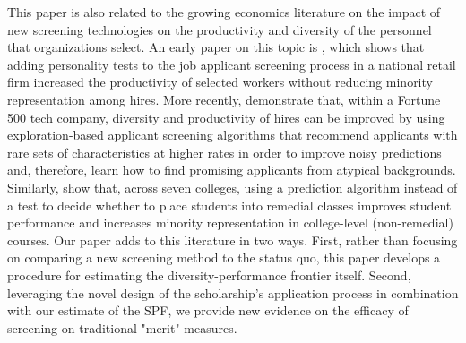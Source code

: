 This paper is also related to the growing economics literature on the impact of new screening technologies on the productivity and diversity of the personnel that organizations select. An early paper on this topic is , which shows that adding personality tests to the job applicant screening process in a national retail firm increased the productivity of selected workers without reducing minority representation among hires. More recently,  demonstrate that, within a Fortune 500 tech company, diversity and productivity of hires can be improved by using exploration-based applicant screening algorithms that recommend applicants with rare sets of characteristics at higher rates in order to improve noisy predictions and, therefore, learn how to find promising applicants from atypical backgrounds. Similarly,  show that, across seven colleges, using a prediction algorithm instead of a test to decide whether to place students into remedial classes improves student performance and increases minority representation in college-level (non-remedial) courses. Our paper adds to this literature in two ways. First, rather than focusing on comparing a new screening method to the status quo, this paper develops a procedure for estimating the diversity-performance frontier itself. Second, leveraging the novel design of the scholarship's application process in combination with our estimate of the SPF, we provide new evidence on the efficacy of screening on traditional "merit" measures. 

